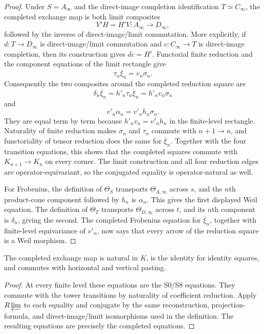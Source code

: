 \begin{proof}

Under $S=A_\infty$ and the direct-image completion identification
$T\simeq C_\infty$, the completed exchange map is both limit composites
\[
 V'H=H'V:A_\infty\longrightarrow D_\infty,
\]
followed by the inverse of direct-image/limit commutation.  More explicitly,
if $d:T\to D_\infty$ is direct-image/limit commutation and
$c:C_\infty\to T$ is direct-image completion, then its construction gives
$dc=H'$.  Functorial finite
reduction and the component equations of the limit rectangle give
\[
 \tau_n\overline\xi_n=v_n\sigma_n.
\]
Consequently the two composites around the completed reduction square are
\[
 \delta_n\overline\xi_n
 =h'_n\tau_n\overline\xi_n=h'_nv_n\sigma_n
\]
and
\[
 v'_n\alpha_n=v'_nh_n\sigma_n.
\]
They are equal term by term because $h'_nv_n=v'_nh_n$ in the finite-level
rectangle.  Naturality of finite reduction makes $\sigma_n$ and $\tau_n$
commute with $n+1\to n$, and functoriality of tensor reduction does the same
for $\overline\xi_n$.  Together with the four transition equations, this
shows that the completed squares commute with $K_{n+1}\to K_n$ on every
corner.  The limit construction and all four reduction edges are
operator-equivariant, so the conjugated equality is operator-natural as well.

For Frobenius, the definition of $\Theta_S$ transports
$\Theta_{A,\infty}$ across $s$, and the $n$th product-cone component followed
by $h_n$ is $\alpha_n$.  This gives the first displayed Weil equation.  The
definition of $\Theta_T$ transports $\Theta_{D,\infty}$ across $t$, and its
$n$th component is $\delta_n$, giving the second.  The completed Frobenius
equation for $\overline\xi_n$, together with finite-level equivariance of
$v'_n$, now says that every arrow of the reduction square is a Weil morphism.
\end{proof}

\begin{lemma}
\label{lemma:weil-pbc-completed-exchange-coherence}
The completed exchange map is natural in $K$, is the identity for identity
squares, and commutes with horizontal and vertical pasting.
\end{lemma}
\begin{proof}

At every finite level these equations are the S0/S8 equations.  They commute
with the tower transitions by naturality of coefficient reduction.  Apply
$R\varprojlim$ to each equality and conjugate by the same reconstruction,
projection-formula, and direct-image/limit isomorphisms used in the definition.
The resulting equations are precisely the completed equations.
\end{proof}

